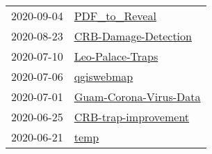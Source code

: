 \begin{longtable}{ll}
2020-09-04 &                                               \href{https://github.com/aubreymoore/PDF_to_Reveal}{PDF_to_Reveal} \\
2020-08-23 &                                 \href{https://github.com/aubreymoore/CRB-Damage-Detection}{CRB-Damage-Detection} \\
2020-07-10 &                                         \href{https://github.com/aubreymoore/Leo-Palace-Traps}{Leo-Palace-Traps} \\
2020-07-06 &                                                     \href{https://github.com/aubreymoore/qgiswebmap}{qgiswebmap} \\
2020-07-01 &                             \href{https://github.com/aubreymoore/Guam-Corona-Virus-Data}{Guam-Corona-Virus-Data} \\
2020-06-25 &                                 \href{https://github.com/aubreymoore/CRB-trap-improvement}{CRB-trap-improvement} \\
2020-06-21 &                                                                 \href{https://github.com/aubreymoore/temp}{temp} \\
\end{longtable}

